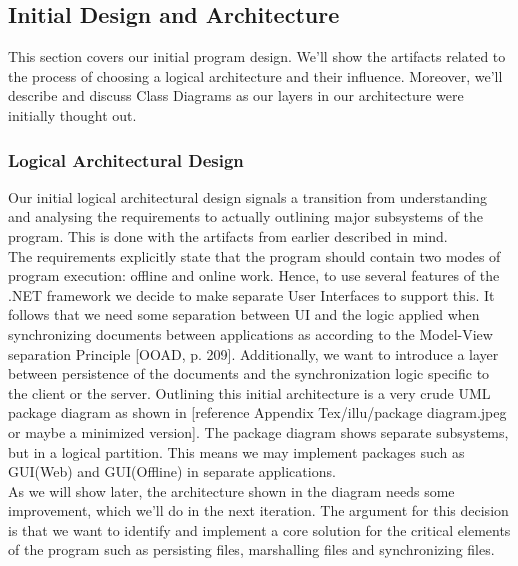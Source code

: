 \subsection{Initial Design and Architecture}
This section covers our initial program design. We’ll show the artifacts related to the process of choosing a logical architecture and their influence. Moreover, we’ll describe and discuss Class Diagrams as our layers in our architecture were initially thought out. 
\subsubsection{Logical Architectural Design}
Our initial logical architectural design signals a transition from understanding and analysing the requirements to actually outlining major subsystems of the program. This is done with the artifacts from earlier described in mind.\\
The requirements explicitly state that the program should contain two modes of program execution: offline and online work. Hence, to use several features of the .NET framework we decide to make separate User Interfaces to support this. It follows that we need some separation between UI and the logic applied when synchronizing documents between applications as according to the Model-View separation Principle [OOAD, p. 209]. Additionally, we want to introduce a layer between persistence of the documents and the synchronization logic specific to the client or the server. Outlining this initial architecture is a very crude UML package diagram as shown in [reference Appendix Tex/illu/package diagram.jpeg or maybe a minimized version]. 
The package diagram shows separate subsystems, but in a logical partition. This means we may implement packages such as GUI(Web) and GUI(Offline) in separate applications.\\
As we will show later, the architecture shown in the diagram needs some improvement, which we’ll do in the next iteration. The argument for this decision is that we want to identify and implement a core solution for the critical elements of the program such as persisting files, marshalling files and synchronizing files.\\
